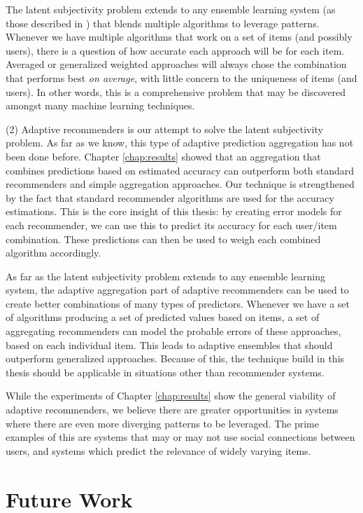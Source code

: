 The latent subjectivity problem extends to any ensemble learning system
(as those described in \cite{Polikar2006}) that blends multiple 
algorithms to leverage patterns.
Whenever we have multiple algorithms that work on a set of items
(and possibly users), there is a question of how accurate each
approach will be for each item.
Averaged or generalized weighted approaches will always
chose the combination that performs best \emph{on average},
with little concern to the uniqueness of items (and users).
In other words, this is a comprehensive problem
that may be discovered amongst many machine learning techniques.

(2) Adaptive recommenders is our attempt to solve the latent subjectivity problem.
As far as we know, this type of adaptive prediction aggregation has not been done before.
Chapter \ref{chap:results} showed that an aggregation that combines predictions based
on estimated accuracy can outperform both standard recommenders and simple aggregation approaches.
Our technique is strengthened by the fact that standard recommender algorithms
are used for the accuracy estimations.
This is the core insight of this thesis: 
by creating error models for each recommender, we can use this to predict
its accuracy for each user/item combination.
These predictions can then be used to weigh each combined algorithm accordingly.

As far as the latent subjectivity problem extends to any ensemble learning system,
the adaptive aggregation part of adaptive recommenders can be used to 
create better combinations of many types of predictors.
Whenever we have a set of algorithms producing a set of predicted values
based on items, a set of aggregating recommenders can model the probable
errors of these approaches, based on each individual item.
This leads to adaptive ensembles that should outperform generalized approaches.
Because of this, the technique build in this thesis should be 
applicable in situations other than recommender systems.

While the experiments of Chapter \ref{chap:results} show the general viability of adaptive recommenders,
we believe there are greater opportunities in systems where there  are even more diverging
patterns to be leveraged. The prime examples of this are systems that may or may 
not use social connections between users, and systems which predict the 
relevance of widely varying items.


\section{Future Work}      


